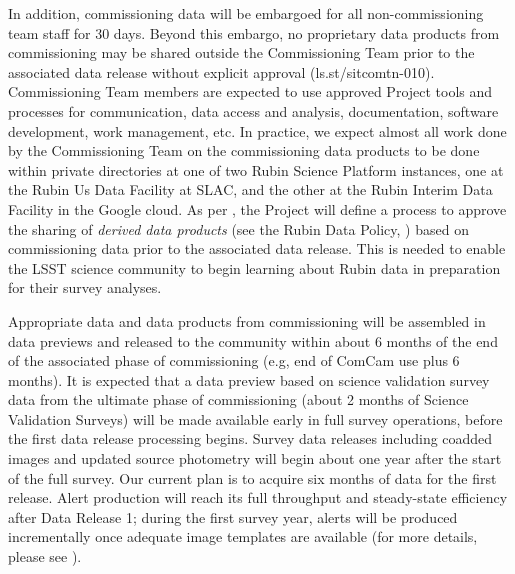 In addition, commissioning data will be embargoed for all non-commissioning team staff for 30 days. 
Beyond this embargo, no proprietary data products from commissioning may be shared outside the Commissioning Team prior to the associated data release without explicit approval (ls.st/sitcomtn-010). 
Commissioning Team members are expected to use approved Project tools and processes for communication, data access and analysis, documentation, software development, work management, etc.
In practice, we expect almost all work done by the Commissioning Team on the commissioning data products to be done within private directories at one of two Rubin Science Platform instances, one at the Rubin Us Data Facility at SLAC, and the other at the Rubin Interim Data Facility in the Google cloud.
As per , the Project will define a process to approve the sharing of {\it derived data products} (see the Rubin Data Policy, ) based on commissioning data prior to the associated data release.
This is needed to enable the LSST science community to begin learning about Rubin data in preparation for their survey analyses. 

Appropriate data and data products from commissioning will be assembled in data previews  and released to the community within about 6 months of the end of the associated phase of commissioning (e.g, end of ComCam use plus 6 months).
It is expected that a data preview based on science validation survey data from the ultimate phase of commissioning (about 2 months of Science Validation Surveys) will be made available early in full survey operations, before the first data release processing begins.
Survey data releases including coadded images and updated source photometry will begin about one year after the start of the full survey. 
Our current plan is to acquire six months of data for the first release.
Alert production will reach its full throughput and steady-state efficiency after Data Release 1; during the first survey year, alerts will be produced incrementally once adequate image templates are available (for more details, please see ). 
